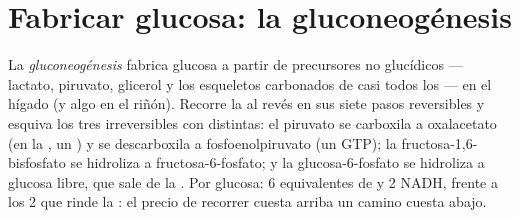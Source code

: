 \section{Fabricar glucosa: la gluconeogénesis}

\begin{definition}[Gluconeogénesis]\label{def:b1:biosyntheses-integration:gluconeogenesis}
La \emph{gluconeogénesis} fabrica glucosa a partir de precursores no
glucídicos --- lactato, piruvato, glicerol y los esqueletos carbonados de
casi todos los  --- en el hígado (y algo en el riñón). Recorre la
 al revés en sus siete pasos reversibles y esquiva los tres
irreversibles con  distintas: el piruvato se carboxila a oxalacetato
(en la , un ) y se descarboxila a fosfoenolpiruvato (un GTP);
la fructosa-1,6-bisfosfato se hidroliza a fructosa-6-fosfato; y la
glucosa-6-fosfato se hidroliza a glucosa libre, que sale de la . Por
glucosa: 6 equivalentes de  y 2 NADH, frente a los 2  que rinde la
: el precio de recorrer cuesta arriba un camino cuesta abajo.
\end{definition}

